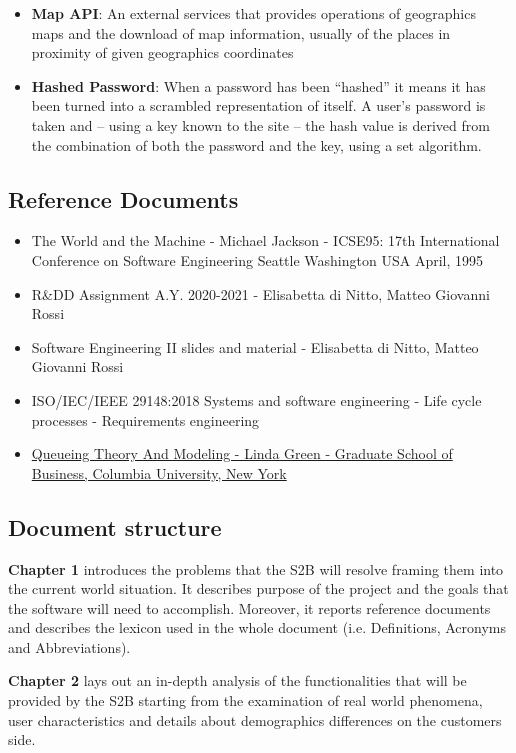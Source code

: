 \begin{itemize}
      \item \textbf{Map API}: An external services that provides operations of geographics maps and the download of map information, usually of the places in proximity of given geographics coordinates
      \item \textbf{Hashed Password}: When a password has been “hashed” it means it has been turned into a scrambled representation of itself. A user's password is taken and – using a key known to the site – the hash value is derived from the combination of both the password and the key, using a set algorithm.
\end{itemize}

\subsection{Reference Documents}

\begin{itemize}
      \item The World and the Machine - Michael Jackson - ICSE95: 17th International Conference on Software Engineering Seattle Washington USA April, 1995
      \item R\&DD Assignment A.Y. 2020-2021 - Elisabetta di Nitto, Matteo Giovanni Rossi
      \item Software Engineering II slides and material - Elisabetta di Nitto, Matteo Giovanni Rossi
      \item ISO/IEC/IEEE 29148:2018 Systems and software engineering - Life cycle processes - Requirements engineering
      \item \href{https://www0.gsb.columbia.edu/mygsb/faculty/research/pubfiles/5474/queueing%20theory%20and%20modeling.pdf}{Queueing Theory And Modeling - Linda Green - Graduate School of Business, Columbia University, New York}
\end{itemize}

\subsection{Document structure}

\textbf{Chapter 1} introduces the problems that the S2B will resolve framing them into the current world situation. It describes purpose of the project and the goals that the software will need to accomplish. Moreover, it reports reference documents and describes the lexicon used in the whole document (i.e. Definitions, Acronyms and Abbreviations).

\textbf{Chapter 2} lays out an in-depth analysis of the functionalities that will be provided by the S2B starting from the examination of real world phenomena, user characteristics and details about demographics differences on the customers side.


